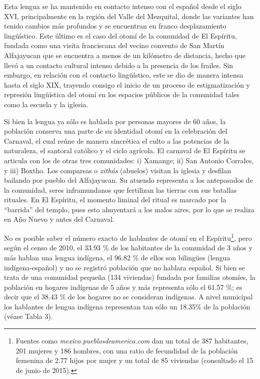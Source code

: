 \documentclass[output=paper]{../langscibook}
\begin{document}
Esta lengua se ha mantenido en contacto intenso con el español desde el siglo XVI, principalmente en la región del Valle del Mezquital, donde las variantes han tenido cambios más profundos y se encuentran en franco desplazamiento lingüístico. Este último es el caso del otomí de la comunidad de El Espíritu, fundada como una visita franciscana del vecino convento de San Martín Alfajayucan que se encuentra a menos de un kilómetro de distancia, hecho que llevó a un contacto cultural intenso debido a la presencia de los frailes. Sin embargo, en relación con el contacto lingüístico, este se dio de manera intensa hasta el siglo XIX, trayendo consigo el inicio de un proceso de estigmatización y represión lingüística del otomí en los espacios públicos de la comunidad tales como la escuela y la iglesia.

Si bien la lengua ya sólo es hablada por personas mayores de 60 años, la población conserva una parte de su identidad otomí en la celebración del Carnaval, el cual reúne de manera sincrética el culto a las potencias de la naturaleza, el santoral católico y el ciclo agrícola. El carnaval de El Espíritu se articula con los de otras tres comunidades:  i) Xamange; ii) San Antonio Corrales, y iii) Boxtho. Los comparsas o \textit{xithás} (abuelos) visitan la iglesia y desfilan bailando por pueblo del Alfajayucan. Su atuendo representa a los antepasados de la comunidad, seres inframundanos que fertilizan las tierras con sus batallas rituales. En El Espíritu, el momento liminal del ritual es marcado por la “barrida” del templo, pues esto ahuyentará a los malos aires, por lo que se realiza en Año Nuevo y antes del Carnaval.

No es posible saber el número exacto de hablantes de otomí en el Espíritu\footnote{Fuentes como \textit{mexico.pueblosdeamerica.com} dan un total de 387 habitantes, 201 mujeres y 186 hombres, con una ratio de fecundidad de la población femenina de 2.77 hijos por mujer y un total de 85 viviendas (consultado el 15 de junio de 2015).}, pero según el censo de 2010, el 33.93 \% de los habitantes de la comunidad de 3 años y más hablan una lengua indígena, el 96.82 \% de ellos son bilingües (lengua indígena-español) y no se registró población que no hablara español. Si bien se trata de una comunidad pequeña (134 viviendas) fundada por familias otomíes, la población en hogares indígenas de 5 años y más representa sólo el 61.57 \%; es decir que el 38.43 \% de los hogares no se consideran indígenas. A nivel municipal los hablantes de lengua indígena representan tan sólo un 18.35\% de la población (véase Tabla 3).
\end{document}
